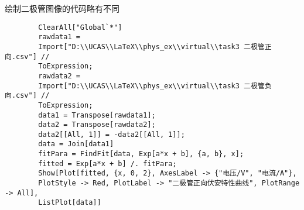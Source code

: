 \documentclass[11pt]{article}
\begin{document}
	绘制二极管图像的代码略有不同
	\begin{lstlisting}
		ClearAll["Global`*"]
		rawdata1 = 
		Import["D:\\UCAS\\LaTeX\\phys_ex\\virtual\\task3 二极管正向.csv"] // 
		ToExpression;
		rawdata2 = 
		Import["D:\\UCAS\\LaTeX\\phys_ex\\virtual\\task3 二极管负向.csv"] // 
		ToExpression;
		data1 = Transpose[rawdata1];
		data2 = Transpose[rawdata2];
		data2[[All, 1]] = -data2[[All, 1]];
		data = Join[data1]
		fitPara = FindFit[data, Exp[a*x + b], {a, b}, x];
		fitted = Exp[a*x + b] /. fitPara;
		Show[Plot[fitted, {x, 0, 2}, AxesLabel -> {"电压/V", "电流/A"}, 
		PlotStyle -> Red, PlotLabel -> "二极管正向伏安特性曲线", PlotRange -> All], 
		ListPlot[data]]
	\end{lstlisting}
\end{document}
